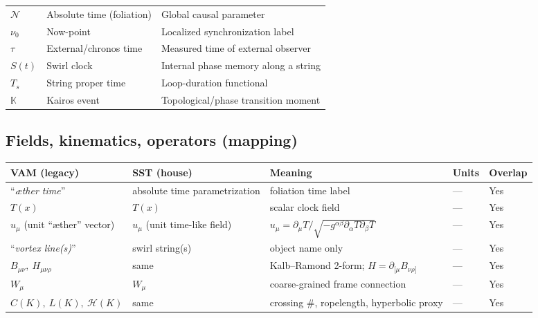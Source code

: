 \documentclass[11pt]{article}
\begin{document}
        \begin{center}
            \scriptsize
            \begin{tabular}{lll}
                $\mathcal{N}$ & Absolute time (foliation) & Global causal parameter \\
                $\nu_0$       & Now-point                 & Localized synchronization label \\
                $\tau$        & External/chronos time     & Measured time of external observer \\
                $S(t)$        & Swirl clock               & Internal phase memory along a string \\
                $T_{\!s}$     & String proper time        & Loop-duration functional \\
                $\mathbb{K}$  & Kairos event              & Topological/phase transition moment \\
            \end{tabular}
        \end{center}

    \subsection*{Fields, kinematics, operators (mapping)}
        \begin{center}
            \scriptsize
            \begin{tabular}{lllll}
                \hline
                \textbf{VAM (legacy)} & \textbf{SST (house)} & \textbf{Meaning} & \textbf{Units} & \textbf{Overlap} \\
                \hline
                ``\textit{æther time}'' & absolute time parametrization & foliation time label & — & Yes \\
                $T(x)$ & $T(x)$ & scalar clock field & — & Yes \\
                $u_\mu$ (unit ``æther'' vector) & $u_\mu$ (unit time-like field) & $u_\mu=\partial_\mu T/\sqrt{-g^{\alpha\beta}\partial_\alpha T\partial_\beta T}$ & — & Yes \\
                ``\textit{vortex line(s)}'' & swirl string(s) & object name only & — & Yes \\
                $B_{\mu\nu},\ H_{\mu\nu\rho}$ & same & Kalb--Ramond 2-form; $H=\partial_{[\mu}B_{\nu\rho]}$ & — & Yes \\
                $W_\mu$ & $W_\mu$ & coarse-grained frame connection & — & Yes \\
                $C(K),\ L(K),\ \mathcal H(K)$ & same & crossing \#, ropelength, hyperbolic proxy & — & Yes \\
                \hline
            \end{tabular}
        \end{center}
\end{document}
